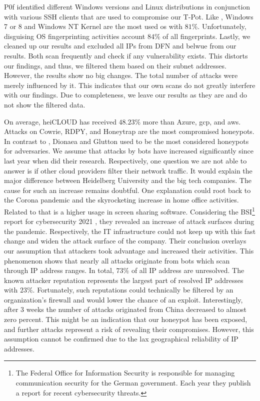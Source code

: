 P0f identified different Windows versions and Linux distributions in conjunction with various SSH clients that are used to compromise our T-Pot.
Like \citet{Kelly2021}, Windows 7 or 8 and Windows NT Kernel are the most used \ac{os} with $81\%$.
Unfortunately, disguising OS fingerprinting activities account $84\%$ of all fingerprints.
Lastly, we cleaned up our results and excluded all IPs from DFN and \acs{belwue} from our results.
Both scan frequently and check if any vulnerability exists.
This distorts our findings, and thus, we filtered them based on their subnet addresses.
However, the results show no big changes.
The total number of attacks were merely influenced by it.
This indicates that our own scans do not greatly interfere with our findings.
Due to completeness, we leave our results as they are and do not show the filtered data.

On average, heiCLOUD has received $48.23\%$ more than Azure, \ac{gcp}, and \ac{aws}.
Attacks on Cowrie, RDPY, and Honeytrap are the most compromised honeypots.
In contrast to \citet{Kelly2021}, Dionaea and Glutton used to be the most considered honeypots for adversaries.
We assume that attacks by bots have increased significantly since last year when \citet{Kelly2021} did their research.
Respectively, one question we are not able to answer is if other cloud providers filter their network traffic.
It would explain the major difference between Heidelberg University and the big tech companies.
The cause for such an increase remains doubtful.
One explanation could root back to the Corona pandemic and the skyrocketing increase in home office activities.
Related to that is a higher usage in screen sharing software.
Considering the BSI\footnote{The Federal Office for Information Security is responsible for managing communication security for the German government. Each year they publish a report for recent cybersecurity threats.} report for cybersecurity 2021 \cite{bsi2021}, they revealed an increase of attack surfaces during the pandemic.
Respectively, the IT infrastructure could not keep up with this fast change and widen the attack surface of the company.
Their conclusion overlays our assumption that attackers took advantage and increased their activities.
This phenomenon shows that nearly all attacks originate from bots which scan through IP address ranges.
In total, $73\%$ of all IP address are unresolved.
The known attacker reputation represents the largest part of resolved IP addresses with $23\%$.
Fortunately, such reputations could technically be filtered by an organization's firewall and would lower the chance of an exploit.
Interestingly, after 3 weeks the number of attacks originated from China decreased to almost zero percent.
This might be an indication that our honeypot has been exposed, and further attacks represent a risk of revealing their compromises.
However, this assumption cannot be confirmed due to the lax geographical reliability of IP addresses.

